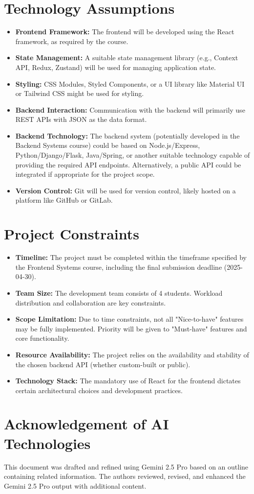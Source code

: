 \documentclass[a4paper,11pt]{article}
\begin{document}
\section{Technology Assumptions}
\begin{itemize}
    \item \textbf{Frontend Framework:} The frontend will be developed using the React framework, as required by the course.
    \item \textbf{State Management:} A suitable state management library (e.g., Context API, Redux, Zustand) will be used for managing application state.
    \item \textbf{Styling:} CSS Modules, Styled Components, or a UI library like Material UI or Tailwind CSS might be used for styling.
    \item \textbf{Backend Interaction:} Communication with the backend will primarily use REST APIs with JSON as the data format.
    \item \textbf{Backend Technology:} The backend system (potentially developed in the Backend Systems course) could be based on Node.js/Express, Python/Django/Flask, Java/Spring, or another suitable technology capable of providing the required API endpoints. Alternatively, a public API could be integrated if appropriate for the project scope.
    \item \textbf{Version Control:} Git will be used for version control, likely hosted on a platform like GitHub or GitLab.
\end{itemize}

\section{Project Constraints}
\begin{itemize}
    \item \textbf{Timeline:} The project must be completed within the timeframe specified by the Frontend Systems course, including the final submission deadline (2025-04-30).
    \item \textbf{Team Size:} The development team consists of 4 students. Workload distribution and collaboration are key constraints.
    \item \textbf{Scope Limitation:} Due to time constraints, not all "Nice-to-have" features may be fully implemented. Priority will be given to "Must-have" features and core functionality.
    \item \textbf{Resource Availability:} The project relies on the availability and stability of the chosen backend API (whether custom-built or public).
    \item \textbf{Technology Stack:} The mandatory use of React for the frontend dictates certain architectural choices and development practices.
\end{itemize}

\section*{Acknowledgement of AI Technologies}
This document was drafted and refined using Gemini 2.5 Pro based on an outline containing related information. The authors reviewed, revised, and enhanced the Gemini 2.5 Pro
output with additional content.
\end{document}
